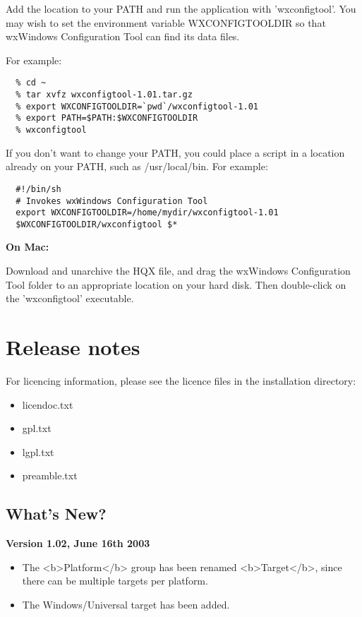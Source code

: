 Add the location to your PATH and run the application with
'wxconfigtool'. You may wish to set the environment variable
WXCONFIGTOOLDIR so that wxWindows Configuration Tool can find its data files.

For example:

\begin{verbatim}
  % cd ~
  % tar xvfz wxconfigtool-1.01.tar.gz
  % export WXCONFIGTOOLDIR=`pwd`/wxconfigtool-1.01
  % export PATH=$PATH:$WXCONFIGTOOLDIR
  % wxconfigtool
\end{verbatim}

If you don't want to change your PATH, you could place a
script in a location already on your PATH, such as
/usr/local/bin. For example:

\begin{verbatim}
  #!/bin/sh
  # Invokes wxWindows Configuration Tool
  export WXCONFIGTOOLDIR=/home/mydir/wxconfigtool-1.01
  $WXCONFIGTOOLDIR/wxconfigtool $*
\end{verbatim}

{\bf On Mac:}

Download and unarchive the HQX file, and drag the wxWindows Configuration Tool folder to an appropriate location
on your hard disk. Then double-click on the 'wxconfigtool' executable.

\chapter{Release notes}\label{releasenotes}%
%
\setfooter{\thepage}{}{}{}{}{\thepage}%

For licencing information, please see
the licence files in the installation directory:

\begin{itemize}\itemsep=0pt
\item licendoc.txt
\item gpl.txt
\item lgpl.txt
\item preamble.txt
\end{itemize}

\section{What's New?}\label{whatsnew}

{\bf Version 1.02, June 16th 2003}

\begin{itemize}\itemsep=10pt
\item The <b>Platform</b> group has been renamed
<b>Target</b>, since there can be multiple targets
per platform.
\item The Windows/Universal target has been added.
\end{itemize}

